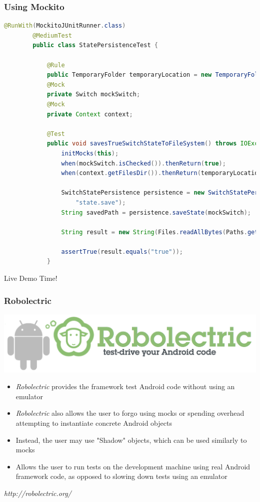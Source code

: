 \documentclass[10pt]{beamer}
\begin{document}
\begin{frame}[fragile]
    \frametitle{Using Mockito}
    \begin{lstlisting}[language=java, caption={StatePersistenceTest.java}]
        @RunWith(MockitoJUnitRunner.class)
        @MediumTest
        public class StatePersistenceTest {

            @Rule
            public TemporaryFolder temporaryLocation = new TemporaryFolder();
            @Mock
            private Switch mockSwitch;
            @Mock
            private Context context;

            @Test
            public void savesTrueSwitchStateToFileSystem() throws IOException {
                initMocks(this);
                when(mockSwitch.isChecked()).thenReturn(true);
                when(context.getFilesDir()).thenReturn(temporaryLocation.newFolder());

                SwitchStatePersistence persistence = new SwitchStatePersistence(context,
                    "state.save");
                String savedPath = persistence.saveState(mockSwitch);

                String result = new String(Files.readAllBytes(Paths.get(savedPath)));

                assertTrue(result.equals("true"));
            }
    \end{lstlisting}
    Live Demo Time!
\end{frame}

\begin{frame}
    \frametitle{Robolectric}
    \center\includegraphics[scale=0.25]{3rd_party/robolectric}
    \begin{itemize}
        \item \textit{Robolectric} provides the framework test Android code without using an
        emulator
        \item \textit{Robolectric} also allows the user to forgo using mocks or spending overhead
        attempting to instantiate concrete Android objects
        \item Instead, the user may use "Shadow" objects, which can be used similarly to mocks
        \item Allows the user to run tests on the development machine using real Android framework code, as opposed
        to slowing down tests using an emulator
    \end{itemize}
    \tiny\emph{http://robolectric.org/}
\end{frame}
\end{document}
